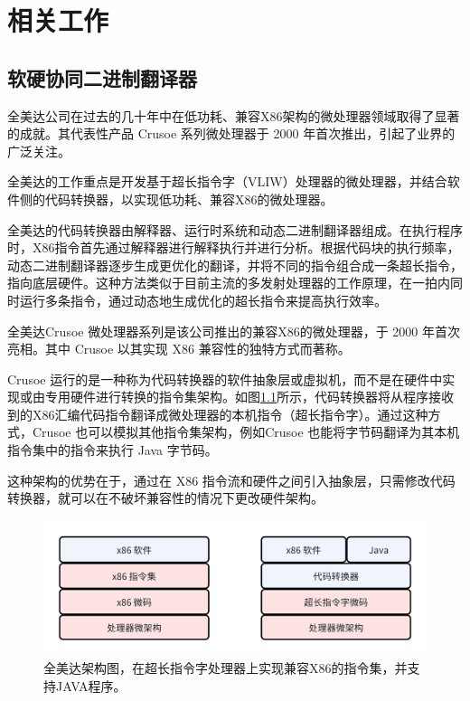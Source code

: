 \chapter{相关工作}\label{chap:related_work}

\section{软硬协同二进制翻译器}

全美达公司在过去的几十年中在低功耗、兼容X86架构的微处理器领域取得了显著的成就。其代表性产品 Crusoe 系列微处理器于 2000 年首次推出，引起了业界的广泛关注。

全美达的工作重点是开发基于超长指令字（VLIW）处理器的微处理器，并结合软件侧的代码转换器，以实现低功耗、兼容X86的微处理器。


全美达的代码转换器\cite{dehnertTransmetaCodeMorphing2003}由解释器、运行时系统和动态二进制翻译器组成。在执行程序时，X86指令首先通过解释器进行解释执行并进行分析。根据代码块的执行频率，动态二进制翻译器逐步生成更优化的翻译，并将不同的指令组合成一条超长指令，指向底层硬件。这种方法类似于目前主流的多发射处理器的工作原理，在一拍内同时运行多条指令，通过动态地生成优化的超长指令来提高执行效率。


全美达Crusoe 微处理器系列是该公司推出的兼容X86的微处理器，于 2000 年首次亮相。其中 Crusoe 以其实现 X86 兼容性的独特方式而著称。

Crusoe 运行的是一种称为代码转换器的软件抽象层或虚拟机，而不是在硬件中实现或由专用硬件进行转换的指令集架构。如图\ref{img:transmeta_arch}所示，代码转换器将从程序接收到的X86汇编代码指令翻译成微处理器的本机指令（超长指令字）。通过这种方式，Crusoe 也可以模拟其他指令集架构，例如Crusoe 也能将字节码翻译为其本机指令集中的指令来执行 Java 字节码。

这种架构的优势在于，通过在 X86 指令流和硬件之间引入抽象层，只需修改代码转换器，就可以在不破坏兼容性的情况下更改硬件架构。

\begin{figure}[h]
    \centering
    \includegraphics[width=0.8\linewidth]{./feishuImage/transmeta_arch.png}
    \caption{全美达架构图，在超长指令字处理器上实现兼容X86的指令集，并支持JAVA程序。}
    \label{img:transmeta_arch}
  \end{figure}


